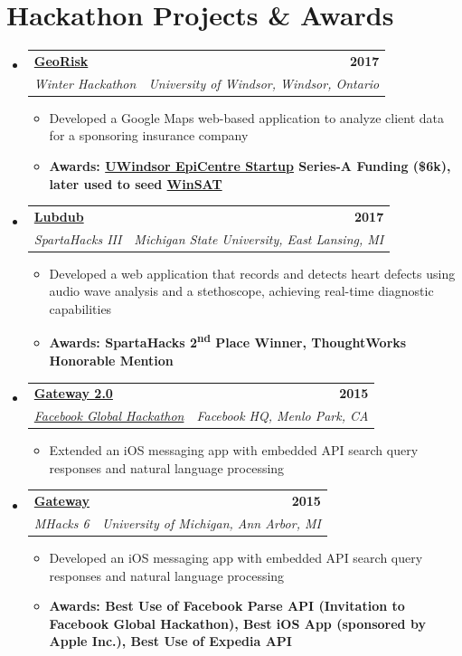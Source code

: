 \documentclass[letterpaper,11pt]{article}
\makeatletter
\newcommand{\resumeItem}[1]{
  \item\small{
    {#1 \vspace{-2pt}}
  }
}
\newcommand{\resumeSubheading}[4]{
  \vspace{-2pt}\item
    \begin{tabular*}{1.0\textwidth}[t]{l@{\extracolsep{\fill}}r}
      \textbf{#1} & \textbf{\small #2} \\
      \textit{\small#3} & \textit{\small #4} \\
    \end{tabular*}\vspace{-7pt}
}
\newcommand{\resumeSubHeadingListStart}{\begin{itemize}[leftmargin=0.0in, label={}]}
\newcommand{\resumeSubHeadingListEnd}{\end{itemize}}
\newcommand{\resumeItemListStart}{\begin{itemize}}
\newcommand{\resumeItemListEnd}{\end{itemize}\vspace{-5pt}}
\newcommand{\shiftleft}[2]{\makebox[0pt][r]{\makebox[#1][l]{#2}}}
\newcommand{\cvIcon}[1]{\BeginAccSupp{ActualText={}}#1\EndAccSupp{}}
\def\shiftleft#1#2{}%
\def\faCode{}%
\makeatother
\begin{document}
\section[Hackathon Projects \& Awards]{\shiftleft{18pt}{\cvIcon{\faCode}}Hackathon Projects \& Awards}
  \resumeSubHeadingListStart
    \vspace{3pt}
    \resumeSubheading
      {\href{https://www.epicentreuwindsor.ca/winter-hackathon-a-great-experience-for-uwindsor-students/}{GeoRisk}}{2017}
      {Winter Hackathon}{University of Windsor, Windsor, Ontario}
      \resumeItemListStart
        \resumeItem{Developed a Google Maps web-based application to analyze client data for a sponsoring insurance company}
        \resumeItem{\textbf{Awards: \href{https://www.uwindsor.ca/aauheads/resources/epicentre.html}{UWindsor EpiCentre Startup} Series-A Funding (\$6k), later used to seed \href{https://atillasaadat.com/post/winsat-3u-leo-cube-satellite/}{WinSAT}}}
      \resumeItemListEnd
    \vspace{3pt}
    \resumeSubheading
      {\href{http://devpost.com/software/lubdub}{Lubdub}}{2017}
      {SpartaHacks III}{Michigan State University, East Lansing, MI}
      \resumeItemListStart
        \resumeItem{Developed a web application that records and detects heart defects using audio wave analysis and a stethoscope, achieving real-time diagnostic capabilities}
        \resumeItem{\textbf{Awards: SpartaHacks 2\textsuperscript{nd} Place Winner, ThoughtWorks Honorable Mention}}
      \resumeItemListEnd
    \vspace{3pt}
    \resumeSubheading
      {\href{https://devpost.com/software/gateway}{Gateway 2.0}}{2015}
      {\href{https://www.facebook.com/hackathon/}{Facebook Global Hackathon}}{Facebook HQ, Menlo Park, CA}
      \resumeItemListStart
        \resumeItem{Extended an iOS messaging app with embedded API search query responses and natural language processing}
      \resumeItemListEnd
    \vspace{3pt}
    \resumeSubheading
      {\href{https://devpost.com/software/gateway}{Gateway}}{2015}
      {MHacks 6}{University of Michigan, Ann Arbor, MI}
      \resumeItemListStart
        \resumeItem{Developed an iOS messaging app with embedded API search query responses and natural language processing}
        \resumeItem{\textbf{Awards: Best Use of Facebook Parse API (Invitation to Facebook Global Hackathon), Best iOS App (sponsored by Apple Inc.), Best Use of Expedia API}}
      \resumeItemListEnd
  \resumeSubHeadingListEnd
  
\end{document}

